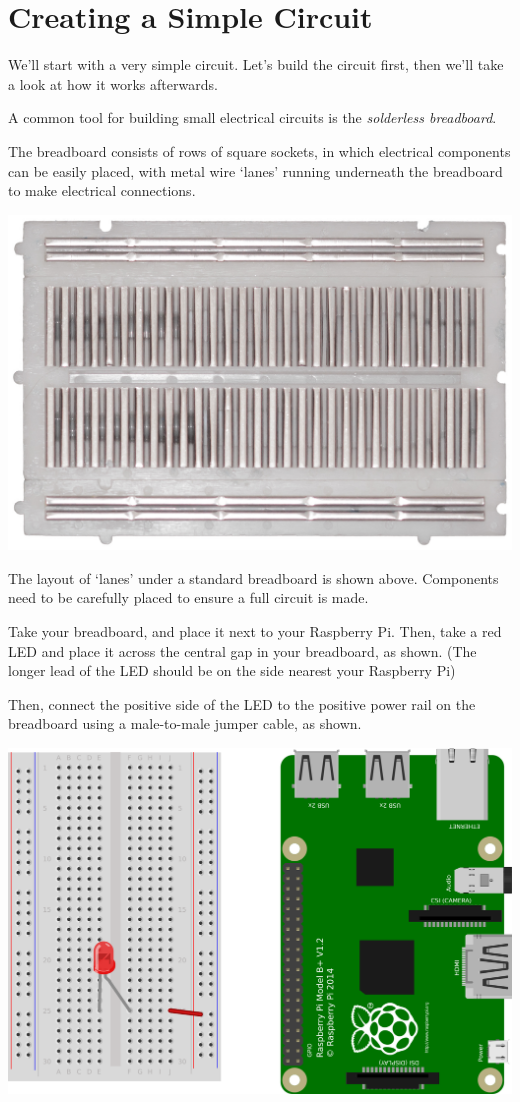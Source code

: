 \section{Creating a Simple Circuit}

We'll start with a very simple circuit. Let's build the circuit first, then we'll take a look at how it works afterwards.

	\begin{aside}
		
		A common tool for building small electrical circuits is the \textit{solderless breadboard}.
		
		The breadboard consists of rows of square sockets, in which electrical components can be easily placed, with metal wire `lanes' running underneath the breadboard to make electrical connections.
			
		\begin{center}
			\includegraphics[width=0.7\linewidth]{McrRaspJam/011_Motors/1_LED/breadboard_underside}
		\end{center}
	
		The layout of `lanes' under a standard breadboard is shown above. Components need to be carefully placed to ensure a full circuit is made.
	
	\end{aside}


	Take your breadboard, and place it next to your Raspberry Pi. Then, take a red LED and place it across the central gap in your breadboard, as shown. (The longer lead of the LED should be on the side nearest your Raspberry Pi)
	
	Then, connect the positive side of the LED to the positive power rail on the breadboard using a male-to-male jumper cable, as shown.
	
	\begin{center}
		\includegraphics[width=0.7\linewidth]{McrRaspJam/015_GPIOZero/1_simplecircuit/2}
	\end{center}

